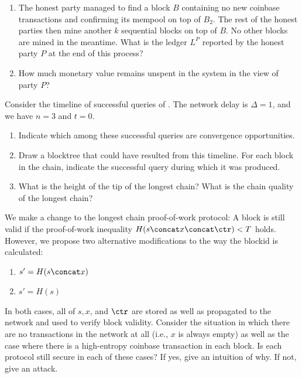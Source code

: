 \begin{problems}
\begin{enumerate}
                are mined. Which transactions will the mempool of this party
                contain?
          \item The honest party managed to find a block $B$ containing no new
                coinbase transactions and confirming its mempool on top of
                $B_2$. The rest of the honest parties then mine another $k$
                sequential blocks on top of $B$. No other blocks are mined in
                the meantime. What is the ledger $L^P$ reported by the honest
                party $P$ at the end of this process?
          \item How much monetary value remains unspent in the system in the
                view of party $P$?
        \end{enumerate}
  \item Consider the timeline of successful queries of . The
        network delay is $\Delta = 1$, and we have $n = 3$ and $t = 0$.
        \label{problem.timeline}
        \begin{enumerate}
          \item Indicate which among these successful queries are convergence
                opportunities.
          \item Draw a blocktree that could have resulted from this timeline.
                For each block in the chain, indicate the successful query
                during which it was produced.
          \item What is the height of the tip of the longest chain? What is the
                chain quality of the longest chain?
        \end{enumerate}
  \item We make a change to the longest chain proof-of-work protocol:
        A block is still valid if the proof-of-work inequality $H(s \concat x \concat \ctr) < T$
        holds. However, we propose two alternative modifications to the way the blockid is calculated:

        \begin{enumerate}
          \item $s' = H(s \concat x)$
          \item $s' = H(s)$
        \end{enumerate}

        In both cases, all of $s, x$, and $\ctr$ are stored as well as propagated to the network
        and used to verify block validity.
        Consider the situation in which there are no transactions in the network at all (i.e.,
        $x$ is always empty) as well as the case where there is a high-entropy coinbase transaction
        in each block.
        Is each protocol still secure in each of these cases?
        If yes, give an intuition of why. If not, give an attack.
\end{problems}


